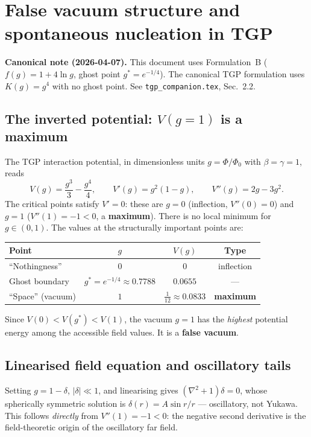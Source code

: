 
\section{False vacuum structure and spontaneous nucleation in TGP}
\label{sec:false_vacuum}

\medskip\noindent\textbf{Canonical note (2026-04-07).} This document uses Formulation~B ($f(g) = 1+4\ln g$, ghost point $g^* = e^{-1/4}$). The canonical TGP formulation uses $K(g) = g^4$ with no ghost point. See \texttt{tgp\_companion.tex}, Sec.~2.2.\medskip

\subsection{The inverted potential: $V(g=1)$ is a maximum}

The TGP interaction potential, in dimensionless units $g=\Phi/\Phi_0$
with $\beta=\gamma=1$, reads
\begin{equation}
  V(g) = \frac{g^3}{3} - \frac{g^4}{4},
  \qquad
  V'(g) = g^2(1-g),
  \qquad
  V''(g) = 2g - 3g^2.
\end{equation}
The critical points satisfy $V'=0$: these are $g=0$ (inflection,
$V''(0)=0$) and $g=1$ ($V''(1)=-1<0$, a \textbf{maximum}).  There is
no local minimum for $g\in(0,1)$.  The values at the
structurally important points are:

\begin{center}
\begin{tabular}{lccc}
\hline
Point & $g$ & $V(g)$ & Type \\
\hline
``Nothingness'' & $0$ & $0$ & inflection \\
Ghost boundary & $g^*=e^{-1/4}\approx0.7788$ & $0.0655$ & --- \\
``Space'' (vacuum) & $1$ & $\tfrac{1}{12}\approx0.0833$ & \textbf{maximum} \\
\hline
\end{tabular}
\end{center}

\noindent
Since $V(0)<V(g^*)<V(1)$, the vacuum $g=1$ has the \emph{highest}
potential energy among the accessible field values.  It is a
\textbf{false vacuum}.

\subsection{Linearised field equation and oscillatory tails}

Setting $g=1-\delta$, $|\delta|\ll1$, and linearising gives
$(\nabla^2+1)\delta=0$, whose spherically symmetric solution is
$\delta(r)=A\sin r/r$ — oscillatory, not Yukawa.  This follows
\emph{directly} from $V''(1)=-1<0$: the negative second derivative
is the field-theoretic origin of the oscillatory far field.

